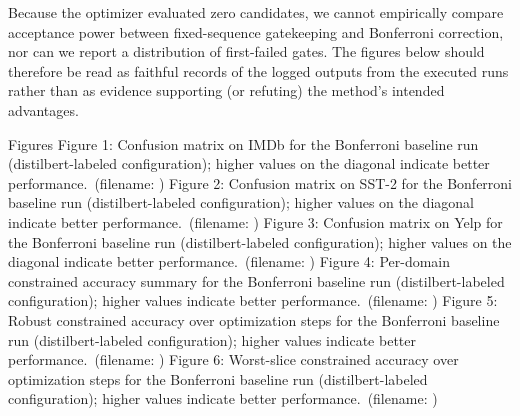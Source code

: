 \documentclass{article} %
\begin{document}
Because the optimizer evaluated zero candidates, we cannot empirically compare acceptance power between fixed-sequence gatekeeping and Bonferroni correction, nor can we report a distribution of first-failed gates. The figures below should therefore be read as faithful records of the logged outputs from the executed runs rather than as evidence supporting (or refuting) the method’s intended advantages.

Figures
Figure 1: Confusion matrix on IMDb for the Bonferroni baseline run (distilbert-labeled configuration); higher values on the diagonal indicate better performance.\ (filename: )
Figure 2: Confusion matrix on SST-2 for the Bonferroni baseline run (distilbert-labeled configuration); higher values on the diagonal indicate better performance.\ (filename: )
Figure 3: Confusion matrix on Yelp for the Bonferroni baseline run (distilbert-labeled configuration); higher values on the diagonal indicate better performance.\ (filename: )
Figure 4: Per-domain constrained accuracy summary for the Bonferroni baseline run (distilbert-labeled configuration); higher values indicate better performance.\ (filename: )
Figure 5: Robust constrained accuracy over optimization steps for the Bonferroni baseline run (distilbert-labeled configuration); higher values indicate better performance.\ (filename: )
Figure 6: Worst-slice constrained accuracy over optimization steps for the Bonferroni baseline run (distilbert-labeled configuration); higher values indicate better performance.\ (filename: )
\end{document}
